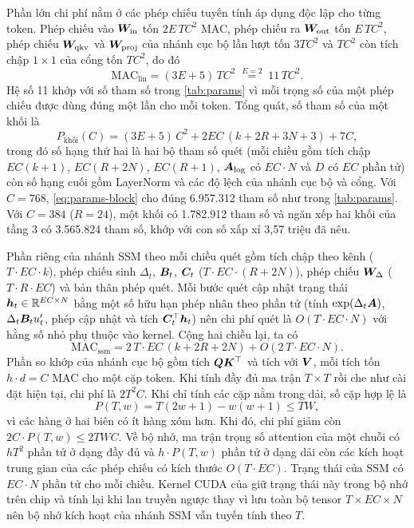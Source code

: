 Phần lớn chi phí nằm ở các phép chiếu tuyến tính áp dụng độc lập cho từng token. Phép chiếu vào $\bm{W}_{\text{in}}$ tốn $2E\,TC^2$ MAC, phép chiếu ra $\bm{W}_{\text{out}}$ tốn $E\,TC^2$, phép chiếu $\bm{W}_{\text{qkv}}$ và $\bm{W}_{\text{proj}}$ của nhánh cục bộ lần lượt tốn $3TC^2$ và $TC^2$ còn tích chập $1 \times 1$ của cổng tốn $TC^2$, do đó
\begin{equation}
\mathrm{MAC}_{\text{lin}} = (3E + 5)\,TC^2 \;\overset{E = 2}{=}\; 11\,TC^2.
\label{eq:mac-lin}
\end{equation}
Hệ số 11 khớp với số tham số trong \cref{tab:params} vì mỗi trọng số của một phép chiếu được dùng đúng một lần cho mỗi token. Tổng quát, số tham số của một khối là
\begin{equation}
P_{\text{khối}}(C) = (3E + 5)\,C^2 + 2EC\,(k + 2R + 3N + 3) + 7C,
\label{eq:params-block}
\end{equation}
trong đó số hạng thứ hai là hai bộ tham số quét (mỗi chiều gồm tích chập $EC(k+1)$,  $EC(R + 2N)$,  $EC(R+1)$, $\bm{A}_{\log}$ có $EC \cdot N$ và $D$ có $EC$ phần tử) còn số hạng cuối gồm LayerNorm và các độ lệch của nhánh cục bộ và cổng. Với $C = 768$, \cref{eq:params-block} cho đúng 6.957.312 tham số như trong \cref{tab:params}. Với $C = 384$ ($R = 24$), một khối có 1.782.912 tham số và ngăn xếp hai khối của tầng 3 có 3.565.824 tham số, khớp với con số xấp xỉ 3,57 triệu đã nêu.

Phần riêng của nhánh SSM theo mỗi chiều quét gồm tích chập theo kênh ($T \cdot EC \cdot k$), phép chiếu sinh $\Delta_t$, $\bm{B}_t$, $\bm{C}_t$ ($T \cdot EC \cdot (R + 2N)$), phép chiếu $\bm{W}_\Delta$ ($T \cdot R \cdot EC$) và bản thân phép quét. Mỗi bước quét cập nhật trạng thái $\bm{h}_t \in \mathbb{R}^{EC \times N}$ bằng một số hữu hạn phép nhân theo phần tử (tính $\exp(\Delta_t \bm{A})$, $\Delta_t \bm{B}_t u'_t$, phép cập nhật và tích $\bm{C}_t^{\top}\bm{h}_t$) nên chi phí quét là $O(T \cdot EC \cdot N)$ với hằng số nhỏ phụ thuộc vào kernel. Cộng hai chiều lại, ta có
\begin{equation}
\mathrm{MAC}_{\text{ssm}} = 2\,T \cdot EC\,(k + 2R + 2N) + O(2\,T \cdot EC \cdot N).
\label{eq:mac-ssm}
\end{equation}
Phần so khớp của nhánh cục bộ gồm tích $\bm{Q}\bm{K}^{\top}$ và tích với $\bm{V}$, mỗi tích tốn $h \cdot d = C$ MAC cho một cặp token. Khi tính đầy đủ ma trận $T \times T$ rồi che như cài đặt hiện tại, chi phí là $2T^2C$. Khi chỉ tính các cặp nằm trong dải, số cặp hợp lệ là
\begin{equation}
P(T, w) = T(2w + 1) - w(w + 1) \leq TW,
\label{eq:band-pairs}
\end{equation}
vì các hàng ở hai biên có ít hàng xóm hơn. Khi đó, chi phí giảm còn $2C \cdot P(T, w) \leq 2TWC$. Về bộ nhớ, ma trận trọng số attention của một chuỗi có $hT^2$ phần tử ở dạng đầy đủ và $h \cdot P(T, w)$ phần tử ở dạng dải còn các kích hoạt trung gian của các phép chiếu có kích thước $O(T \cdot EC)$. Trạng thái của SSM có $EC \cdot N$ phần tử cho mỗi chiều. Kernel CUDA của  giữ trạng thái này trong bộ nhớ trên chip và tính lại khi lan truyền ngược thay vì lưu toàn bộ tensor $T \times EC \times N$ \cite{gu2023mamba} nên bộ nhớ kích hoạt của nhánh SSM vẫn tuyến tính theo $T$.

